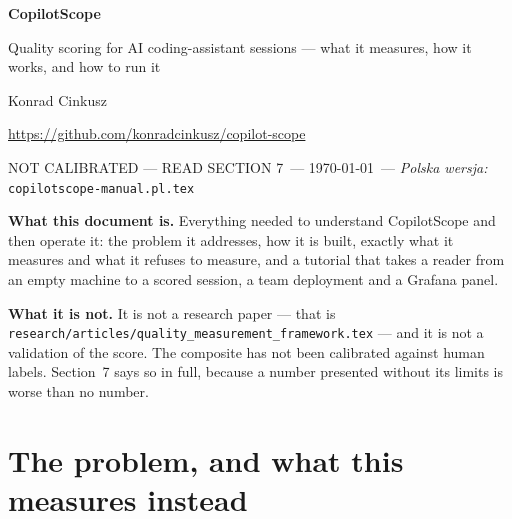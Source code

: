 \documentclass[11pt,a4paper]{article}
\newcommand{\docstatus}{NOT CALIBRATED --- READ SECTION 7}
\begin{document}
\thispagestyle{plain}
\begin{center}
    {\LARGE\bfseries\sffamily\color{darkblue} CopilotScope}

    \vspace{0.3cm}

    {\Large\sffamily\color{darkgray} Quality scoring for AI coding-assistant
    sessions --- what it measures, how it works, and how to run it}

    \vspace{0.6cm}

    {\large Konrad Cinkusz}

    \vspace{0.2cm}

    {\normalsize\color{darkgray} \url{https://github.com/konradcinkusz/copilot-scope}}

    \vspace{0.2cm}

    {\normalsize\color{accentred}\sffamily \docstatus\ --- \today\ ---
     \textit{Polska wersja: } \texttt{copilotscope-manual.pl.tex}}
\end{center}

\vspace{0.4cm}

\begin{center}
\begin{minipage}{0.92\linewidth}
\small
\textbf{What this document is.} Everything needed to understand CopilotScope and
then operate it: the problem it addresses, how it is built, exactly what it
measures and what it refuses to measure, and a tutorial that takes a reader from
an empty machine to a scored session, a team deployment and a Grafana panel.

\textbf{What it is not.} It is not a research paper --- that is
\texttt{research/articles/quality\_measurement\_framework.tex} --- and it is not
a validation of the score. The composite has not been calibrated against human
labels. Section~7 says so in full, because a number presented without its
limits is worse than no number.
\end{minipage}
\end{center}

\vspace{0.5cm}

{\small\tableofcontents}

\newpage

\section{The problem, and what this measures instead}
\end{document}
